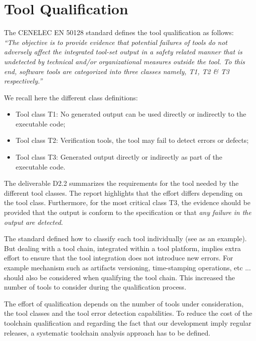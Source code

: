 \section{Tool Qualification}
\label{sec:sota-tool-qualification}


The CENELEC EN 50128 standard \cite{standard_railway_2011} defines the tool
qualification as follows:\\
{\it ``The objective is to provide evidence that potential
failures of tools do not adversely affect the integrated tool-set output in a
safety related manner that is undetected by technical and/or organizational
measures outside the tool. To this end, software tools are categorized into
three classes namely, T1, T2 \& T3 respectively.''}

We recall here the different class definitions:
\begin{itemize}
\item Tool class T1: No generated output can be used directly or indirectly to the
  executable code;
\item Tool class T2: Verification tools, the tool may fail to detect errors or
  defects;
\item Tool class T3: Generated output directly or indirectly  as part of the
  executable code.
\end{itemize}
The deliverable D2.2 \cite{pokam_report_2013} summarizes the requirements for the
tool needed by the different tool classes. The report highlights that the
effort differs depending on the tool class. Furthermore, for
the most critical class T3,  the evidence should be provided that the output is
conform to the specification or that \emph{any failure in the output
  are detected}. 

The standard defined how to classify each tool individually (see
\cite{nielsen_efficient_2012,huang_test_2013} as an example).  But dealing with a tool
chain, integrated within a tool platform, implies extra effort to
ensure that the tool integration does not introduce new errors. For
example mechanism such as artifacts versioning, time-stamping
operations, etc ... should also be considered when qualifying the tool
chain. This increased the number of tools to consider during the
qualification process.

The effort of qualification depends on the number of tools under
consideration, the tool classes and the tool error detection
capabilities. To reduce the cost of the toolchain qualification and
regarding the fact that our development imply regular releases, a
systematic toolchain analysis approach has to be defined.

